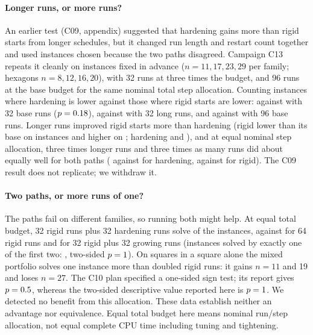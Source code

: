 

\paragraph{Longer runs, or more runs?} An earlier test (C09, appendix) suggested that hardening gains more than rigid starts from longer schedules, but it changed run length and restart count together and used instances chosen because the two paths disagreed. Campaign C13 repeats it cleanly on \BudN{} instances fixed in advance ($n=11,17,23,29$ per family; hexagons $n=8,12,16,20$), with 32 runs at three times the budget, and 96 runs at the base budget for the same nominal total step allocation. Counting instances where hardening is lower against those where rigid starts are lower: \BudOneH{} against \BudOneR{} with 32 base runs ($p=0.18$), \BudThreeH{} against \BudThreeR{} with 32 long runs, and \BudMoreH{} against \BudMoreR{} with 96 base runs. Longer runs improved rigid starts more than hardening (rigid lower than its base on \BudGainR{} instances and higher on \BudLossR; hardening \BudGainH{} and \BudLossH), and at equal nominal step allocation, three times longer runs and three times as many runs did about equally well for both paths (\BudLvMLH{} against \BudLvMMH{} for hardening, \BudLvMLR{} against \BudLvMMR{} for rigid). The C09 result does not replicate; we withdraw it.

\paragraph{Two paths, or more runs of one?} The paths fail on different families, so running both might help. At equal total budget, 32 rigid runs plus 32 hardening runs solve \PortRigidHarden{} of the \CsevenInstances{} instances, against \PortRigidSixtyFour{} for 64 rigid runs and \PortRigidGrow{} for 32 rigid plus 32 growing runs (instances solved by exactly one of the first two: \PortSign, two-sided $p=1$). On squares in a square alone the mixed portfolio solves one instance more than doubled rigid runs: it gains $n=11$ and 19 and loses $n=27$. The C10 plan specified a one-sided sign test; its report gives $p=0.5$, whereas the two-sided descriptive value reported here is $p=1$. We detected no benefit from this allocation. These data establish neither an advantage nor equivalence. Equal total budget here means nominal run/step allocation, not equal complete CPU time including tuning and tightening.

